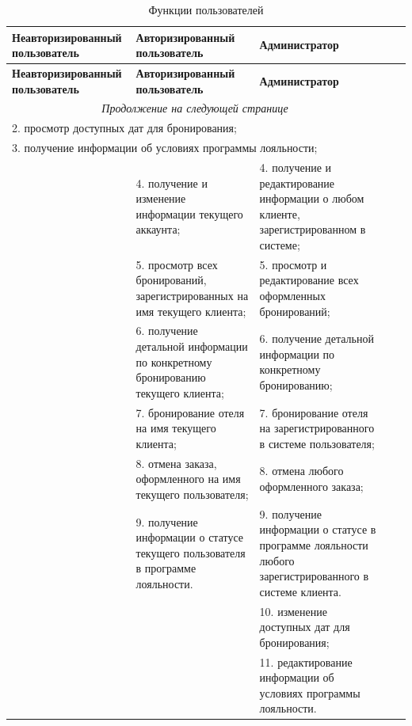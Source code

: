 \begin{longtable}{|p{4.9cm}|p{5.4cm}|p{5.4cm}|}
	\caption{Функции пользователей}
	\label{tbl:func} \\
	\hline
	
	\textbf{Неавторизированный пользователь} & \textbf{Авторизированный пользователь} & \textbf{Администратор} \\
	\hline
	\endfirsthead
	
	\hline
	\textbf{Неавторизированный пользователь} & \textbf{Авторизированный пользователь} & \textbf{Администратор} \\
	\hline
	\endhead
	
	\hline
	\multicolumn{3}{c}{\textit{Продолжение на следующей странице}}
	\endfoot
	\hline
	\endlastfoot
	
	\multicolumn{3}{|l|}{1. просмотр списка всех гостиниц; } \\
	\multicolumn{3}{|l|}{2. просмотр доступных дат для бронирования; } \\
	\multicolumn{3}{|l|}{3. получение информации об условиях программы лояльности; } \\
	\hline
	
	\multirow{6}{*}{}
	&
	4. получение и изменение информации текущего аккаунта;
	&
	4. получение и редактирование информации о любом клиенте, зарегистрированном в системе; \\
	
	&
	5. просмотр всех бронирований, зарегистрированных на имя текущего клиента; 
	&
	5. просмотр и редактирование всех оформленных бронирований; \\
	
	&
	6. получение детальной информации по конкретному бронированию текущего клиента; 
	&
	6. получение детальной информации по конкретному бронированию; \\
	
	&
	7. бронирование отеля на имя текущего клиента;
	&
	7. бронирование отеля на зарегистрированного в системе пользователя; \\
	
	&
	8. отмена заказа, оформленного на имя текущего пользователя;
	&
	8. отмена любого оформленного заказа; \\
	
	& 
	9. получение информации о статусе текущего пользователя в программе лояльности.
	&
	9. получение информации о статусе в программе лояльности любого зарегистрированного в системе клиента. \\
	\cline{2-3}
	
	&
	&
	10. изменение доступных дат для бронирования; \\
	
	&
	&
	11. редактирование информации об условиях программы лояльности. \\
	\hline
\end{longtable}

